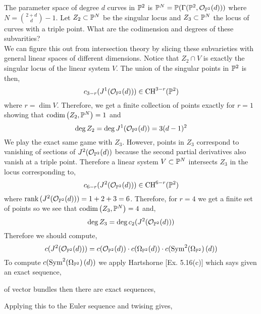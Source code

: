 \documentclass[12pt]{article}
\begin{document}
\begin{example}
The parameter space of degree $d$ curves in $\P^2$ is $\P^N = \P(\Gamma(\P^2, \struct{\P^2}(d)))$ where $N = {2 + d \choose d} - 1$. Let $Z_2 \subset \P^N$ be the singular locus and $Z_3 \subset \P^N$ the locus of curves with a triple point. What are the codimension and degrees of these subvarities?
\bigskip\\
We can figure this out from intersection theory by slicing these subvarieties with general linear spaces of different dimensions. Notice that $Z_2 \cap V$ is exactly the singular locus of the linear system $V$. The union of the singular points in $\P^2$ is then,
\[ c_{3 - r}(J^1(\struct{\P^2}(d))) \in \CH^{3-r}(\P^2) \]
where $r = \dim{V}$. Therefore, we get a finite collection of points exactly for $r = 1$ showing that $\codim{Z_2, \P^N} = 1$ and
\[ \deg{Z_2} = \deg{J^1(\struct{\P^2}(d))} = 3 (d - 1)^2 \]
We play the exact same game with $Z_3$. However, points in $Z_3$ correspond to vanishing of sections of $J^2(\struct{\P^2}(d))$ because the second partial derivatives also vanish at a triple point. Therefore a linear system $V \subset \P^N$ intersects $Z_3$ in the locus corresponding to,
\[ c_{6 - r}(J^2(\struct{\P^2}(d))) \in \CH^{6-r}(\P^2) \]
where $\rank{(J^2(\struct{\P^2}(d)))} = 1 + 2 + 3 = 6$. Therefore, for $r = 4$ we get a finite set of points so we see that $\codim{Z_3, \P^N} = 4$ and,
\[ \deg{Z_3} = \deg{c_2(J^2(\struct{\P^2}(d)))} \]
Therefore we should compute,
\[ c(J^2(\struct{\P^2}(d))) = c(\struct{\P^2}(d)) \cdot c(\Omega_{\P^2}(d)) \cdot c(\nSym{2}{\Omega_{\P^2}}(d)) \]
To compute $c(\nSym{2}{\Omega_{\P^2}}(d))$ we apply Hartshorne [Ex. 5.16(c)] which says given an exact sequence,
\begin{center}
\end{center}
of vector bundles then there are exact sequences,
\begin{center}
\end{center}
Applying this to the Euler sequence and twising gives,
\begin{center}
\begin{tikzcd}

\end{tikzcd}
\end{center}
\end{example}
\end{document}
